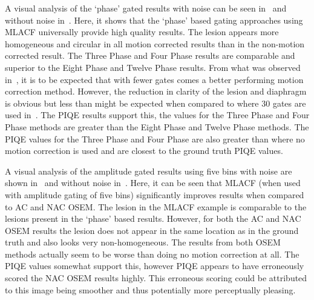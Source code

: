             A visual analysis of the `phase' gated results with noise can be seen in~ and without noise in~. Here, it shows that the `phase' based gating approaches using \gls{MLACF} universally provide high quality results. The lesion appears more homogeneous and circular in all motion corrected results than in the non-motion corrected result. The Three Phase and Four Phase results are comparable and superior to the Eight Phase and Twelve Phase results. From what was observed in~, it is to be expected that with fewer gates comes a better performing motion correction method. However, the reduction in clarity of the lesion and diaphragm is obvious but less than might be expected when compared to where $30$ gates are used in~. The \gls{PIQE} results support this, the values for the Three Phase and Four Phase methods are greater than the Eight Phase and Twelve Phase methods. The \gls{PIQE} values for the Three Phase and Four Phase are also greater than where no motion correction is used and are closest to the ground truth \gls{PIQE} values.
            
            A visual analysis of the amplitude gated results using five bins with noise are shown in~ and without noise in~. Here, it can be seen that \gls{MLACF} (when used with amplitude gating of five bins) significantly improves results when compared to \gls{AC} and \gls{NAC} \gls{OSEM}. The lesion in the \gls{MLACF} example is comparable to the lesions present in the `phase' based results. However, for both the \gls{AC} and \gls{NAC} \gls{OSEM} results the lesion does not appear in the same location as in the ground truth and also looks very non-homogeneous. The results from both \gls{OSEM} methods actually seem to be worse than doing no motion correction at all. The \gls{PIQE} values somewhat support this, however \gls{PIQE} appears to have erroneously scored the \gls{NAC} \gls{OSEM} results highly. This erroneous scoring could be attributed to this image being smoother and thus potentially more perceptually pleasing.
            
